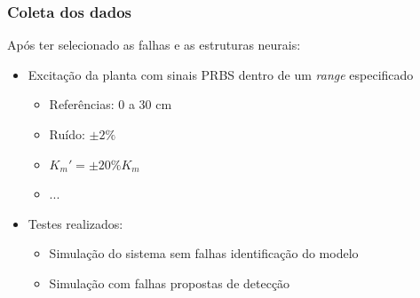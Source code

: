 \documentclass{beamer}
\begin{document}
\begin{frame}
    \frametitle{Coleta dos dados}

    Após ter selecionado as falhas e as estruturas neurais:

\begin{itemize}
    \item Excitação da planta com sinais PRBS dentro de um {\it range}
          especificado
    \begin{itemize}
        \item Referências: 0 a 30 cm
        \item Ruído: $\pm 2\%$
        \item $K_m' = \pm 20\% K_m$
        \item ...
    \end{itemize}
    \item Testes realizados:
    \begin{itemize}
        \item Simulação do sistema sem falhas \implica identificação do modelo
        \item Simulação com falhas \implica propostas de detecção
    \end{itemize}
\end{itemize}
\end{frame}

\end{document}
